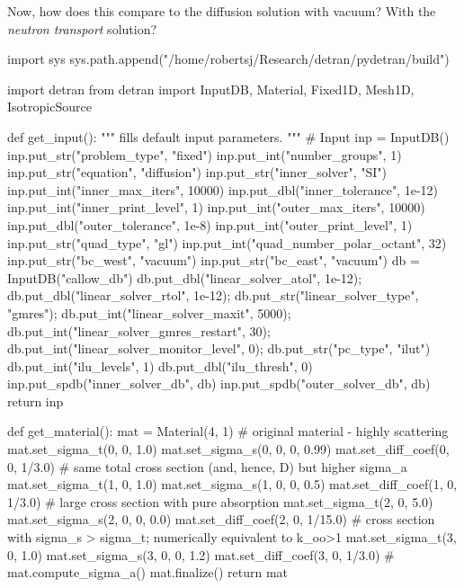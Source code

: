 \documentclass[compact]{ne630handout}
\begin{document}
\begin{handoutflow}
Now, how does this compare to the diffusion solution with vacuum? With the \emph{neutron transport} solution?


\begin{NEunicodecode}
import sys
sys.path.append("/home/robertsj/Research/detran/pydetran/build")

import detran
from detran import InputDB, Material, Fixed1D, Mesh1D, IsotropicSource

def get_input():
    """ fills default input parameters.
    """
    # Input
    inp = InputDB()
    inp.put_str("problem_type",       "fixed")
    inp.put_int("number_groups",      1)
    inp.put_str("equation",           "diffusion")
    inp.put_str("inner_solver",       "SI")
    inp.put_int("inner_max_iters",    10000)
    inp.put_dbl("inner_tolerance",    1e-12)
    inp.put_int("inner_print_level",  1)
    inp.put_int("outer_max_iters",    10000)
    inp.put_dbl("outer_tolerance",    1e-8)
    inp.put_int("outer_print_level",  1)
    inp.put_str("quad_type",                  "gl")
    inp.put_int("quad_number_polar_octant",   32)
    inp.put_str("bc_west",                    "vacuum")
    inp.put_str("bc_east",                    "vacuum")
    db = InputDB("callow_db")
    db.put_dbl("linear_solver_atol",                  1e-12);
    db.put_dbl("linear_solver_rtol",                  1e-12);
    db.put_str("linear_solver_type",                  "gmres");
    db.put_int("linear_solver_maxit",                 5000);
    db.put_int("linear_solver_gmres_restart",         30);
    db.put_int("linear_solver_monitor_level",         0);
    db.put_str("pc_type", "ilut")
    db.put_int("ilu_levels", 1)
    db.put_dbl("ilu_thresh", 0)
    inp.put_spdb("inner_solver_db", db)
    inp.put_spdb("outer_solver_db", db)
    return inp

def get_material():
    mat = Material(4, 1)
    # original material - highly scattering
    mat.set_sigma_t(0, 0, 1.0)
    mat.set_sigma_s(0, 0, 0, 0.99)
    mat.set_diff_coef(0, 0, 1/3.0)
    # same total cross section (and, hence, D) but higher sigma_a
    mat.set_sigma_t(1, 0, 1.0)
    mat.set_sigma_s(1, 0, 0, 0.5)
    mat.set_diff_coef(1, 0, 1/3.0)
    # large cross section with pure absorption
    mat.set_sigma_t(2, 0, 5.0)
    mat.set_sigma_s(2, 0, 0, 0.0)
    mat.set_diff_coef(2, 0, 1/15.0)
    # cross section with sigma_s > sigma_t; numerically equivalent to k_oo>1
    mat.set_sigma_t(3, 0, 1.0)
    mat.set_sigma_s(3, 0, 0, 1.2)
    mat.set_diff_coef(3, 0, 1/3.0)
    #
    mat.compute_sigma_a()
    mat.finalize()
    return mat


\end{NEunicodecode}
\end{handoutflow}
\end{document}
